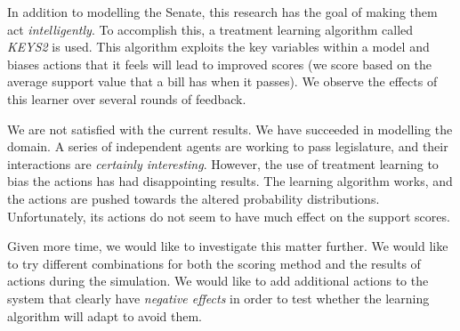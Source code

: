 \documentclass{sig-alternate}
\newcounter{over}
\begin{document}
In addition to modelling the Senate, this research has the goal of making them act {\em intelligently}. To accomplish this, a 
treatment learning algorithm called {\em KEYS2} is used. This algorithm exploits the key variables within a model and biases actions
that it feels will lead to improved scores (we score based on the average support value that a bill has when it passes). We observe the effects
of this learner over several rounds of feedback.

We are not satisfied with the current results. We have succeeded in modelling the domain. A series of independent agents are working
to pass legislature, and their interactions are {\em certainly interesting}. 
However, the use of treatment learning to bias the actions has had disappointing results. The learning algorithm works, 
and the actions are pushed towards the altered probability distributions. Unfortunately, its actions do not seem to have much effect on the
support scores. 

Given more time, we would like to investigate this matter further. We would like to try different combinations for both the scoring
method and the results of actions during the simulation. We would like to add additional actions to the system that clearly have {\em
negative effects} in order to test whether the learning algorithm will adapt to avoid them. 



\end{document}
